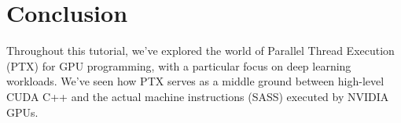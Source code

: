 \section{Conclusion}

Throughout this tutorial, we've explored the world of Parallel Thread Execution (PTX) for GPU programming, with a particular focus on deep learning workloads. We've seen how PTX serves as a middle ground between high-level CUDA C++ and the actual machine instructions (SASS) executed by NVIDIA GPUs.

